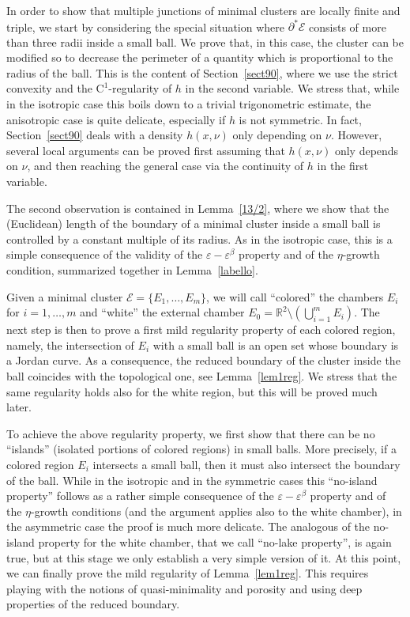 \documentclass[10pt]{amsart}
\newcommand\R{\mathbb{R}}
\let\eps\varepsilon
\newcommand\E{\mathcal{E}}
\theoremstyle{plain}
\theoremstyle{definition}
\begin{document}
In order to show that multiple junctions of minimal clusters are locally finite and triple, we start by considering the special situation where $\partial^*\E$ consists of more than three radii inside a small ball. We prove that, in this case, the cluster can be modified so to decrease the perimeter of a quantity which is proportional to the radius of the ball. This is the content of Section~\ref{sect90}, where we use the strict convexity and the $\mathrm{C}^1$-regularity of $h$ in the second variable. We stress that, while in the isotropic case this boils down to a trivial trigonometric estimate, the anisotropic case is quite delicate, especially if $h$ is not symmetric. In fact, Section~\ref{sect90} deals with a density $h(x,\nu)$ only depending on $\nu$. However, several local arguments can be proved first assuming that $h(x,\nu)$ only depends on $\nu$, and then reaching the general case via the continuity of $h$ in the first variable.

The second observation is contained in Lemma~\ref{13/2}, where we show that the (Euclidean) length of the boundary of a minimal cluster inside a small ball is controlled by a constant multiple of its radius. As in the isotropic case, this is a simple consequence of the validity of the $\varepsilon-\varepsilon^\beta$ property and of the $\eta$-growth condition, summarized together in Lemma~\ref{labello}.

Given a minimal cluster $\mathcal E=\{E_1,\dots,E_m\}$, we will call ``colored'' the chambers $E_i$ for $i=1,\dots, m$ and ``white'' the external chamber $E_0=\R^2\setminus (\bigcup_{i=1}^mE_i)$. The next step is then to prove a first mild regularity property of each colored region, namely, the intersection of $E_i$ with a small ball is an open set whose boundary is a Jordan curve. As a consequence, the reduced boundary of the cluster inside the ball coincides with the topological one, see Lemma~\ref{lem1reg}. We stress that the same regularity holds also for the white region, but this will be proved much later.\enlargethispage{.5\baselineskip}%

To achieve the above regularity property, we first show that there can be no ``islands'' (\ie isolated portions of colored regions) in small balls. More precisely, if a colored region $E_i$ intersects a small ball, then it must also intersect the boundary of the ball. While in the isotropic and in the symmetric cases this ``no-island property'' follows as a rather simple consequence of the $\eps-\eps^\beta$ property and of the $\eta$-growth conditions (and the argument applies also to the white chamber), in the asymmetric case the proof is much more delicate. The analogous of the no-island property for the white chamber, that we call ``no-lake property'', is again true, but at this stage we only establish a very simple version of it. At this point, we can finally prove the mild regularity of Lemma~\ref{lem1reg}. This requires playing with the notions of quasi-minimality and porosity and using deep properties of the reduced boundary.
\end{document}
